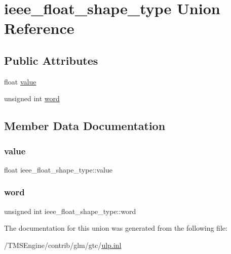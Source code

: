 \hypertarget{unionieee__float__shape__type}{}\section{ieee\+\_\+float\+\_\+shape\+\_\+type Union Reference}
\label{unionieee__float__shape__type}
\subsection*{Public Attributes}
\begin{DoxyCompactItemize}
\item 
float \hyperlink{unionieee__float__shape__type_aa0c47451f1b974421cbb9e2833ddb68e}{value}
\item 
unsigned int \hyperlink{unionieee__float__shape__type_a49230c21acd672d044f38b1abcbd6071}{word}
\end{DoxyCompactItemize}


\subsection{Member Data Documentation}
\mbox{\label{unionieee__float__shape__type_aa0c47451f1b974421cbb9e2833ddb68e}} 
\subsubsection{\texorpdfstring{value}{value}}
{\footnotesize\ttfamily float ieee\+\_\+float\+\_\+shape\+\_\+type\+::value}

\mbox{\label{unionieee__float__shape__type_a49230c21acd672d044f38b1abcbd6071}} 
\subsubsection{\texorpdfstring{word}{word}}
{\footnotesize\ttfamily unsigned int ieee\+\_\+float\+\_\+shape\+\_\+type\+::word}



The documentation for this union was generated from the following file\+:\begin{DoxyCompactItemize}
\item 
/\+T\+M\+S\+Engine/contrib/glm/gtc/\hyperlink{ulp_8inl}{ulp.\+inl}\end{DoxyCompactItemize}
